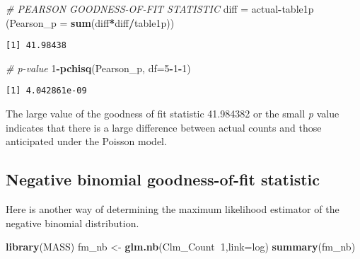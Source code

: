 \documentclass[]{book}
\newenvironment{Shaded}{\begin{snugshade}}{\end{snugshade}}
\newcommand{\KeywordTok}[1]{\textcolor[rgb]{0.13,0.29,0.53}{\textbf{#1}}}
\newcommand{\DataTypeTok}[1]{\textcolor[rgb]{0.13,0.29,0.53}{#1}}
\newcommand{\DecValTok}[1]{\textcolor[rgb]{0.00,0.00,0.81}{#1}}
\newcommand{\StringTok}[1]{\textcolor[rgb]{0.31,0.60,0.02}{#1}}
\newcommand{\CommentTok}[1]{\textcolor[rgb]{0.56,0.35,0.01}{\textit{#1}}}
\newcommand{\OperatorTok}[1]{\textcolor[rgb]{0.81,0.36,0.00}{\textbf{#1}}}
\newcommand{\NormalTok}[1]{#1}
\theoremstyle{definition}
\theoremstyle{definition}
\theoremstyle{definition}
\theoremstyle{remark}
\begin{document}
\begin{Shaded}
\begin{Highlighting}[]
\CommentTok{#  PEARSON GOODNESS-OF-FIT STATISTIC}
\NormalTok{diff =}\StringTok{ }\NormalTok{actual}\OperatorTok{-}\NormalTok{table1p}
\NormalTok{(}\DataTypeTok{Pearson_p =} \KeywordTok{sum}\NormalTok{(diff}\OperatorTok{*}\NormalTok{diff}\OperatorTok{/}\NormalTok{table1p))}
\end{Highlighting}
\end{Shaded}

\begin{verbatim}
[1] 41.98438
\end{verbatim}

\begin{Shaded}
\begin{Highlighting}[]
\CommentTok{#  p-value}
\DecValTok{1}\OperatorTok{-}\KeywordTok{pchisq}\NormalTok{(Pearson_p, }\DataTypeTok{df=}\DecValTok{5}\OperatorTok{-}\DecValTok{1}\OperatorTok{-}\DecValTok{1}\NormalTok{)}
\end{Highlighting}
\end{Shaded}

\begin{verbatim}
[1] 4.042861e-09
\end{verbatim}

The large value of the goodness of fit statistic 41.984382 or the small
\emph{p} value indicates that there is a large difference between actual
counts and those anticipated under the Poisson model.

\subsection{Negative binomial goodness-of-fit
statistic}\label{negative-binomial-goodness-of-fit-statistic}

Here is another way of determining the maximum likelihood estimator of
the negative binomial distribution.

\begin{Shaded}
\begin{Highlighting}[]
\KeywordTok{library}\NormalTok{(MASS)}
\NormalTok{fm_nb <-}\StringTok{ }\KeywordTok{glm.nb}\NormalTok{(Clm_Count}\OperatorTok{~}\DecValTok{1}\NormalTok{,}\DataTypeTok{link=}\NormalTok{log)}
\KeywordTok{summary}\NormalTok{(fm_nb)}
\end{Highlighting}
\end{Shaded}
\end{document}
